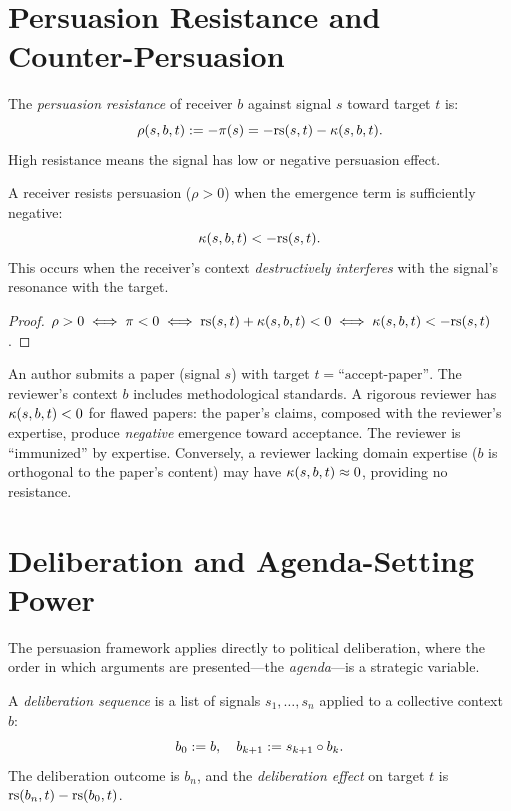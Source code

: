 \section{Persuasion Resistance and Counter-Persuasion}

\begin{definition}
\label{def:persuasion-resistance}
The \emph{persuasion resistance} of receiver $b$ against signal $s$ toward
target $t$ is:
\[
\rho(s, b, t) := -\pi(s) = -\mathrm{rs}(s, t) - \kappa(s, b, t).
\]
High resistance means the signal has low or negative persuasion effect.
\end{definition}

\begin{theorem}
\label{thm:resistance}
A receiver resists persuasion ($\rho > 0$) when the emergence term is
sufficiently negative:
\[
\kappa(s, b, t) < -\mathrm{rs}(s, t).
\]
This occurs when the receiver's context \emph{destructively interferes} with
the signal's resonance with the target.
\end{theorem}

\begin{proof}
$\rho > 0 \iff \pi < 0 \iff \mathrm{rs}(s,t) + \kappa(s,b,t) < 0 \iff \kappa(s,b,t) < -\mathrm{rs}(s,t)$.
\end{proof}

\begin{example}
An author submits a paper (signal $s$) with target $t = \text{``accept-paper''}$.
The reviewer's context $b$ includes methodological standards. A rigorous
reviewer has $\kappa(s, b, t) < 0$ for flawed papers: the paper's claims,
composed with the reviewer's expertise, produce \emph{negative} emergence
toward acceptance. The reviewer is ``immunized'' by expertise. Conversely,
a reviewer lacking domain expertise ($b$ is orthogonal to the paper's
content) may have $\kappa(s, b, t) \approx 0$, providing no resistance.
\end{example}


\section{Deliberation and Agenda-Setting Power}

The persuasion framework applies directly to political deliberation,
where the order in which arguments are presented---the \emph{agenda}---is
a strategic variable.

\begin{definition}
\label{def:deliberation}
A \emph{deliberation sequence} is a list of signals
$s_1, \ldots, s_n$ applied to a collective context $b$:
\[
b_0 := b, \quad b_{k+1} := s_{k+1} \circ b_k.
\]
The deliberation outcome is $b_n$, and the \emph{deliberation effect}
on target $t$ is $\mathrm{rs}(b_n, t) - \mathrm{rs}(b_0, t)$.
\end{definition}

